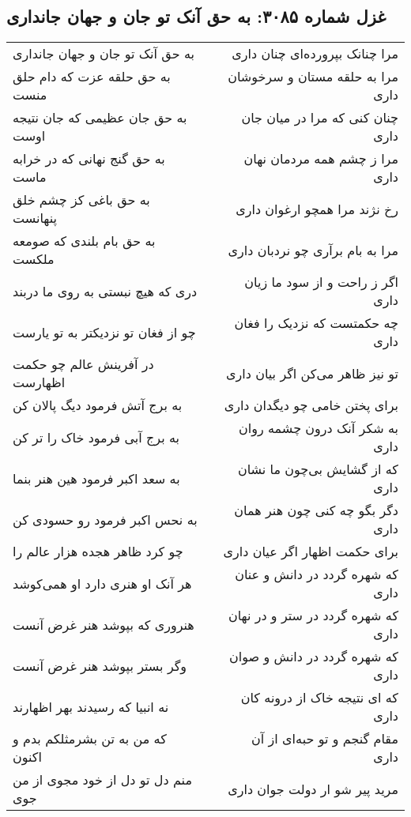 \begin{center}
\section*{غزل شماره ۳۰۸۵: به حق آنک تو جان و جهان جانداری}
\label{sec:3085}
\begin{longtable}{l p{0.5cm} r}
به حق آنک تو جان و جهان جانداری
&&
مرا چنانک بپرورده‌ای چنان داری
\\
به حق حلقه عزت که دام حلق منست
&&
مرا به حلقه مستان و سرخوشان داری
\\
به حق جان عظیمی که جان نتیجه اوست
&&
چنان کنی که مرا در میان جان داری
\\
به حق گنج نهانی که در خرابه ماست
&&
مرا ز چشم همه مردمان نهان داری
\\
به حق باغی کز چشم خلق پنهانست
&&
رخ نژند مرا همچو ارغوان داری
\\
به حق بام بلندی که صومعه ملکست
&&
مرا به بام برآری چو نردبان داری
\\
دری که هیچ نبستی به روی ما دربند
&&
اگر ز راحت و از سود ما زیان داری
\\
چو از فغان تو نزدیکتر به تو یارست
&&
چه حکمتست که نزدیک را فغان داری
\\
در آفرینش عالم چو حکمت اظهارست
&&
تو نیز ظاهر می‌کن اگر بیان داری
\\
به برج آتش فرمود دیگ پالان کن
&&
برای پختن خامی چو دیگدان داری
\\
به برج آبی فرمود خاک را تر کن
&&
به شکر آنک درون چشمه روان داری
\\
به سعد اکبر فرمود هین هنر بنما
&&
که از گشایش بی‌چون ما نشان داری
\\
به نحس اکبر فرمود رو حسودی کن
&&
دگر بگو چه کنی چون هنر همان داری
\\
چو کرد ظاهر هجده هزار عالم را
&&
برای حکمت اظهار اگر عیان داری
\\
هر آنک او هنری دارد او همی‌کوشد
&&
که شهره گردد در دانش و عنان داری
\\
هنروری که بپوشد هنر غرض آنست
&&
که شهره گردد در ستر و در نهان داری
\\
وگر بستر بپوشد هنر غرض آنست
&&
که شهره گردد در دانش و صوان داری
\\
نه انبیا که رسیدند بهر اظهارند
&&
که ای نتیجه خاک از درونه کان داری
\\
که من به تن بشرمثلکم بدم و اکنون
&&
مقام گنجم و تو حبه‌ای از آن داری
\\
منم دل تو دل از خود مجوی از من جوی
&&
مرید پیر شو ار دولت جوان داری
\\

\end{longtable}
\end{center}
